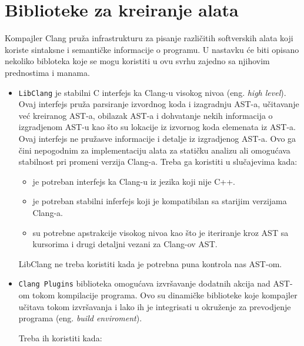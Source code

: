 \documentclass[12pt,oneside]{memoir}
\begin{document}
\section{Biblioteke za kreiranje alata}

 Kompajler Clang pru\v{z}a infrastrukturu za pisanje razli\v{c}itih softverskih alata koji koriste sintaksne i semanti\v{c}ke informacije o programu. U nastavku \'{c}e biti opisano nekoliko bibloteka koje se mogu koristiti u ovu svrhu zajedno sa njihovim prednostima i manama.


\begin{itemize}
\item \lstinline{LibClang} je stabilni C interfejs ka Clang-u visokog nivoa (eng. \textit{high level}). Ovaj interfejs pru\v{z}a parsiranje izvordnog koda
i izagradnju AST-a, u\v{c}itavanje ve\'{c} kreiranog AST-a, obilazak AST-a i dohvatanje nekih informacija o izgradjenom AST-u kao \v{s}to su lokacije iz izvornog koda elemenata iz AST-a. Ovaj interfejs ne pru\v{z}asve informacije i detalje iz izgradjenog AST-a. Ovo ga \v{c}ini nepogodnim za implementaciju alata za stati\v{c}ku analizu ali omogu\'{c}ava stabilnost pri promeni verzija Clang-a.
Treba ga koristiti u slu\v{c}ajevima kada:
\begin{itemize}
  \item je potreban interfejs ka Clang-u iz jezika koji nije C++.
  \item je potreban stabilni inferfejs koji je kompatibilan sa starijim verzijama Clang-a.
  \item su potrebne apstrakcije visokog nivoa kao \v{s}to je iteriranje kroz AST sa kursorima i drugi detaljni vezani za Clang-ov AST.
\end{itemize}
LibClang ne treba koristiti kada je potrebna puna kontrola nas AST-om.

\item \lstinline{Clang Plugins} biblioteka omogu\'{c}ava izvr\v{s}avanje dodatnih akcija nad AST-om tokom kompilacije programa. Ovo su dinami\v{c}ke biblioteke koje kompajler u\v{c}itava tokom izvr\v{s}avanja i lako ih je integrisati u okru\v{z}enje za prevodjenje programa (eng. \textit{build enviroment}).

Treba ih koristiti kada:


\end{itemize}
\end{document}
